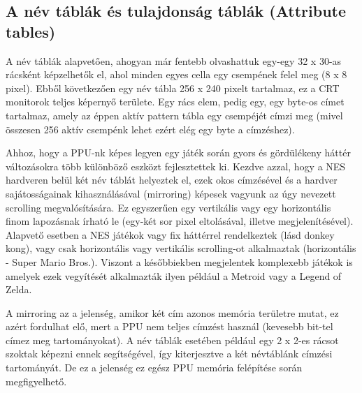 	\subsection{A név táblák és tulajdonság táblák (Attribute tables)}
	
	A név táblák alapvetően, ahogyan már fentebb olvashattuk egy-egy 32 x 30-as rácsként képzelhetők el, ahol minden egyes cella egy csempének felel meg (8 x 8 pixel). Ebből következően egy név tábla 256 x 240 pixelt tartalmaz, ez a CRT monitorok teljes képernyő területe. Egy rács elem, pedig egy, egy byte-os címet tartalmaz, amely az éppen aktív pattern tábla egy csempéjét címzi meg (mivel összesen 256 aktív csempénk lehet ezért elég egy byte a címzéshez).
	
	Ahhoz, hogy a PPU-nk képes legyen egy játék során gyors és gördülékeny háttér változásokra több különböző eszközt fejlesztettek ki. Kezdve azzal, hogy a NES hardveren belül két név táblát helyeztek el, ezek okos címzésével és a hardver sajátosságainak kihasználásával (mirroring) képesek vagyunk az úgy nevezett scrolling megvalósítására. Ez egyszerűen egy vertikális vagy egy horizontális finom lapozásnak írható le (egy-két sor pixel eltolásával, illetve megjelenítésével). Alapvető esetben a NES játékok vagy fix háttérrel rendelkeztek (lásd donkey kong), vagy csak horizontális vagy vertikális scrolling-ot alkalmaztak (horizontális - Super Mario Bros.). Viszont a későbbiekben megjelentek komplexebb játékok is amelyek ezek vegyítését alkalmazták ilyen például a Metroid vagy a Legend of Zelda.
	
	A mirroring az a jelenség, amikor két cím azonos memória területre mutat, ez azért fordulhat elő, mert a PPU nem teljes címzést használ (kevesebb bit-tel címez meg tartományokat). A név táblák esetében például egy 2 x 2-es rácsot szoktak képezni ennek segítségével, így kiterjesztve a két névtáblánk címzési tartományát. De ez a jelenség ez egész PPU memória felépítése során megfigyelhető.
	
